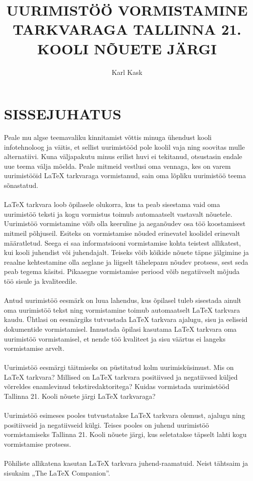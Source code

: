 \documentclass{21kuur}
\title{UURIMISTÖÖ VORMISTAMINE \latex TARKVARAGA TALLINNA 21. KOOLI NÕUETE JÄRGI}
\author{Karl Kask}
\begin{document}
\maketitle
\tableofcontents

\chapter*{SISSEJUHATUS}
Peale mu algse teemavaliku kinnitamist võttis minuga ühendust kooli infotehnoloog ja väitis, et sellist uurimistööd pole koolil vaja ning soovitas mulle alternatiivi. Kuna väljapakutu minus erilist huvi ei tekitanud, otsustasin endale uue teema välja mõelda. Peale mitmeid vestlusi oma vennaga, kes on varem uurimistööid LaTeX tarkvaraga vormistanud, sain oma lõpliku uurimistöö teema sõnastatud.
\\\\LaTeX tarkvara loob õpilasele olukorra, kus ta peab sisestama vaid oma uurimistöö teksti ja kogu vormistus toimub automaatselt vastavalt nõuetele. Uurimistöö vormistamine võib olla keeruline ja aeganõudev osa töö koostamisest mitmeil põhjuseil. Esiteks on vormistamise nõuded erinevatel koolidel erinevalt määratletud. Seega ei saa informatsiooni vormistamise kohta teistest allikatest, kui kooli juhendist või juhendajalt. Teiseks võib kõikide nõuete täpne jälgimine ja reaalne kehtestamine olla aeglane ja liigselt tähelepanu nõudev protsess, sest seda peab tegema käsitsi. Pikaaegne vormistamise periood võib negatiivselt mõjuda töö sisule ja kvaliteedile.
\\\\Antud uurimistöö eesmärk on luua lahendus, kus õpilasel tuleb sisestada ainult oma uurimistöö tekst ning vormistamine toimub automaatselt LaTeX tarkvara kaudu. Ühtlasi on eesmärgiks tutvustada LaTeX tarkvara ajalugu, sisu ja eeliseid dokumentide vormistamisel. Innustada õpilasi kasutama LaTeX tarkvara oma uurimistöö vormistamisel, et nende töö kvaliteet ja sisu väärtus ei langeks vormistamise arvelt. 
\\\\Uurimistöö eesmärgi täitmiseks on püstitatud kolm uurimisküsimust. Mis on LaTeX tarkvara? Millised on LaTeX tarkvara positiivsed ja negatiivsed küljed võrreldes enamlevinud tekstiredaktoritega? Kuidas vormistada uurimistööd Tallinna 21. Kooli nõuete järgi LaTeX tarkvaraga?
\\\\Uurimistöö esimeses pooles tutvustatakse LaTeX tarkvara olemust, ajalugu ning positiivseid ja negatiivseid külgi. Teises pooles on juhend uurimistöö vormistamiseks Tallinna 21. Kooli nõuete järgi, kus seletatakse täpselt lahti kogu vormistamise protsess.
\\\\Põhiliste allikatena kasutan LaTeX tarkvara juhend-raamatuid. Neist tähtsaim ja sisukaim „The LaTeX Companion”.
\end{document}
